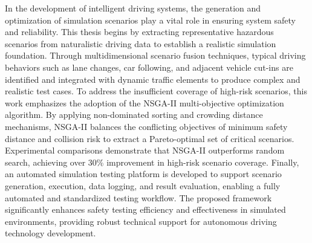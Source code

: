 \begin{abstracten}

In the development of intelligent driving systems, the generation and optimization of simulation scenarios play a vital role in ensuring system safety and reliability. This thesis begins by extracting representative hazardous scenarios from naturalistic driving data to establish a realistic simulation foundation. Through multidimensional scenario fusion techniques, typical driving behaviors such as lane changes, car following, and adjacent vehicle cut-ins are identified and integrated with dynamic traffic elements to produce complex and realistic test cases. To address the insufficient coverage of high-risk scenarios, this work emphasizes the adoption of the NSGA-II multi-objective optimization algorithm. By applying non-dominated sorting and crowding distance mechanisms, NSGA-II balances the conflicting objectives of minimum safety distance and collision risk to extract a Pareto-optimal set of critical scenarios. Experimental comparisons demonstrate that NSGA-II outperforms random search, achieving over 30\% improvement in high-risk scenario coverage. Finally, an automated simulation testing platform is developed to support scenario generation, execution, data logging, and result evaluation, enabling a fully automated and standardized testing workflow. The proposed framework significantly enhances safety testing efficiency and effectiveness in simulated environments, providing robust technical support for autonomous driving technology development.

\end{abstracten}